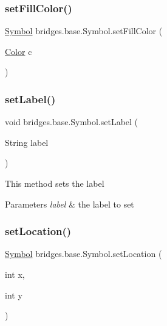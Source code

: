 \mbox{\label{classbridges_1_1base_1_1_symbol_ab9fa8c9df32ee0ded33146ef344943d7}} 
\subsubsection{\texorpdfstring{setFillColor()}{setFillColor()}}
{\footnotesize\ttfamily \mbox{\hyperlink{classbridges_1_1base_1_1_symbol}{Symbol}} bridges.\+base.\+Symbol.\+set\+Fill\+Color (\begin{DoxyParamCaption}\item[{\mbox{\hyperlink{classbridges_1_1base_1_1_color}{Color}}}]{c }\end{DoxyParamCaption})}

\mbox{\label{classbridges_1_1base_1_1_symbol_af6b944374cbd34334caac28d948a3f21}} 
\subsubsection{\texorpdfstring{setLabel()}{setLabel()}}
{\footnotesize\ttfamily void bridges.\+base.\+Symbol.\+set\+Label (\begin{DoxyParamCaption}\item[{String}]{label }\end{DoxyParamCaption})}

This method sets the label


\begin{DoxyParams}{Parameters}
{\em label} & the label to set \\
\hline
\end{DoxyParams}
\mbox{\label{classbridges_1_1base_1_1_symbol_ab378b9b3c5ab203fbb4661697f7f7e0a}} 
\subsubsection{\texorpdfstring{setLocation()}{setLocation()}\hspace{0.1cm}{\footnotesize\ttfamily [1/2]}}
{\footnotesize\ttfamily \mbox{\hyperlink{classbridges_1_1base_1_1_symbol}{Symbol}} bridges.\+base.\+Symbol.\+set\+Location (\begin{DoxyParamCaption}\item[{int}]{x,  }\item[{int}]{y }\end{DoxyParamCaption})}

